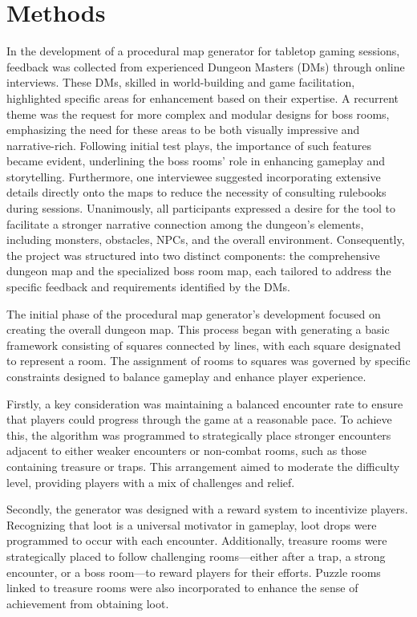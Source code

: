 \documentclass[10pt,twocolumn]{article}
\begin{document}
\section{Methods}
In the development of a procedural map generator for tabletop gaming sessions, feedback was collected from experienced Dungeon Masters (DMs) through online interviews. These DMs, skilled in world-building and game facilitation, highlighted specific areas for enhancement based on their expertise. A recurrent theme was the request for more complex and modular designs for boss rooms, emphasizing the need for these areas to be both visually impressive and narrative-rich. Following initial test plays, the importance of such features became evident, underlining the boss rooms' role in enhancing gameplay and storytelling. Furthermore, one interviewee suggested incorporating extensive details directly onto the maps to reduce the necessity of consulting rulebooks during sessions. Unanimously, all participants expressed a desire for the tool to facilitate a stronger narrative connection among the dungeon's elements, including monsters, obstacles, NPCs, and the overall environment. Consequently, the project was structured into two distinct components: the comprehensive dungeon map and the specialized boss room map, each tailored to address the specific feedback and requirements identified by the DMs.

The initial phase of the procedural map generator's development focused on creating the overall dungeon map. This process began with generating a basic framework consisting of squares connected by lines, with each square designated to represent a room. The assignment of rooms to squares was governed by specific constraints designed to balance gameplay and enhance player experience.

Firstly, a key consideration was maintaining a balanced encounter rate to ensure that players could progress through the game at a reasonable pace. To achieve this, the algorithm was programmed to strategically place stronger encounters adjacent to either weaker encounters or non-combat rooms, such as those containing treasure or traps. This arrangement aimed to moderate the difficulty level, providing players with a mix of challenges and relief.

Secondly, the generator was designed with a reward system to incentivize players. Recognizing that loot is a universal motivator in gameplay, loot drops were programmed to occur with each encounter. Additionally, treasure rooms were strategically placed to follow challenging rooms—either after a trap, a strong encounter, or a boss room—to reward players for their efforts. Puzzle rooms linked to treasure rooms were also incorporated to enhance the sense of achievement from obtaining loot.
\end{document}
